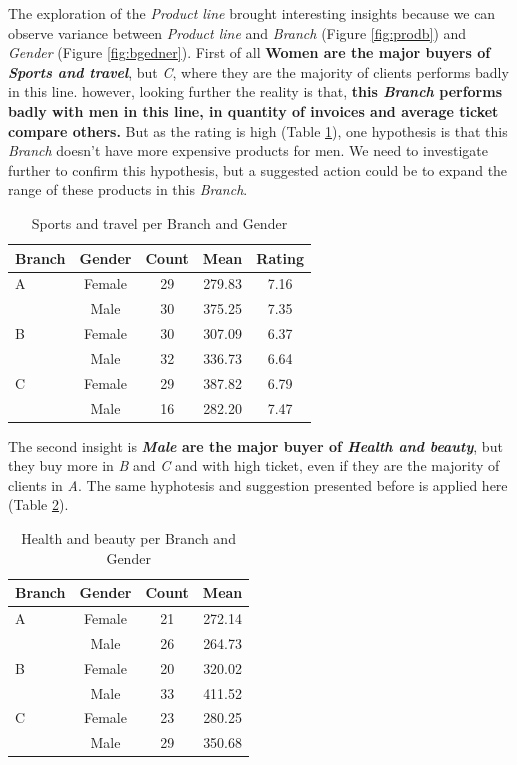 \documentclass[11pt, a4]{article}
\begin{document}
The exploration of the \textit{Product line} brought interesting insights because we can observe variance between \textit{Product line} and \textit{Branch} (Figure \ref{fig:prodb}) and \textit{Gender} (Figure \ref{fig:bgedner}). First of all \textbf{Women are the major buyers of \textit{Sports and travel}}, but \textit{C}, where they are the majority of clients performs badly in this line. however, looking further the reality is that, \textbf{this \textit{Branch} performs badly with men in this line, in quantity of invoices and average ticket compare others.} But as the rating is high (Table \ref{table:3}), one hypothesis is that this \textit{Branch} doesn’t have more expensive products for men. We need to investigate further to confirm this hypothesis, but a suggested action could be to expand the range of these products in this \textit{Branch}. 

\begin{table}[h!]
\centering
\begin{tabular}{l c c c c}
\toprule
\textbf{Branch} & \textbf{Gender} & \textbf{Count} & \textbf{Mean}&\textbf{Rating} \\
\midrule
A&  Female& 	29& 279.83	&7.16 	\\
&Male 	&30 	&375.25 &7.35 	\\
B& 	Female& 	30& 	307.09 &	6.37	\\
&Male 	&32 &	336.73	&6.64 	\\
C& 	Female& 	29& 	387.82 	&	6.79\\	
&Male 	&16 	&282.20&  	7.47 \\
\bottomrule
\end{tabular}
\caption{Sports and travel per Branch and Gender}
\label{table:3}
\end{table}

The second insight is \textbf{\textit{Male} are the major buyer of \textit{Health and beauty}}, but they buy more in \textit{B} and \textit{C} and with high ticket, even if they are the majority of clients in \textit{A}.	The same hyphotesis and suggestion presented before is applied here (Table \ref{table:4}).

\begin{table}[h!]
\centering
\begin{tabular}{l c c c}
\toprule
\textbf{Branch} & \textbf{Gender} & \textbf{Count} & \textbf{Mean} \\
\midrule
A &	Female& 	21& 	272.14\\
&Male 	&26 	&264.73\\
B& 	Female& 	20& 	320.02\\
&Male 	&33 	&411.52\\
C &	Female& 	23& 	280.25\\
&Male 	&29& 	350.68	\\
\bottomrule
\end{tabular}
\caption{Health and beauty per Branch and Gender}
\label{table:4}
\end{table}
\end{document}

